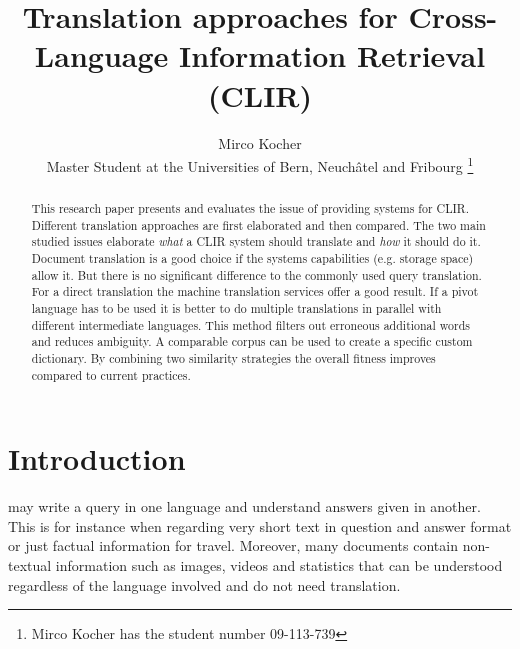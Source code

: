 \documentclass[journal]{IEEEtran}
\begin{document}
\title{Translation approaches for Cross-Language Information Retrieval (CLIR)}

\author{Mirco Kocher\\
Master Student at the Universities of Bern, Neuch\^{a}tel and Fribourg
\thanks{Mirco Kocher has the student number 09-113-739} %
}


\maketitle



\begin{abstract}
This research paper presents and evaluates the issue of providing systems for CLIR.
Different translation approaches are first elaborated and then compared.
The two main studied issues elaborate \textit{what} a CLIR system should translate and \textit{how} it should do it.
Document translation is a good choice if the systems capabilities (e.g. storage space) allow it.
But there is no significant difference to the commonly used query translation.
For a direct translation the machine translation services offer a good result.
If a pivot language has to be used it is better to do multiple translations in parallel with different intermediate languages.
This method filters out erroneous additional words and reduces ambiguity.
A comparable corpus can be used to create a specific custom dictionary.
By combining two similarity strategies the overall fitness improves compared to current practices.
\end{abstract}



\section{Introduction}
 may write a query in one language and understand answers given in another.
This is for instance when regarding very short text in question and answer format or just factual information for travel.
Moreover, many documents contain non-textual information such as images, videos and statistics that can be understood regardless of the language involved and do not need translation.
\end{document}
